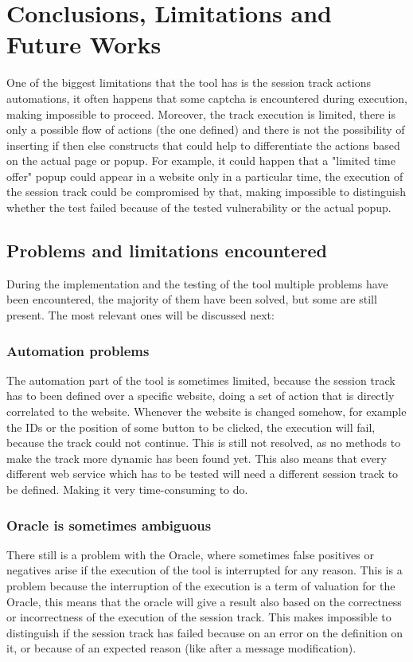 \chapter{Conclusions, Limitations and Future Works}
One of the biggest limitations that the tool has is the session track actions automations, it often happens that some captcha is encountered during execution, making impossible to proceed. Moreover, the track execution is limited, there is only a possible flow of actions (the one defined) and there is not the possibility of inserting if then else constructs that could help to differentiate the actions based on the actual page or popup. For example, it could happen that a "limited time offer" popup could appear in a website only in a particular time, the execution of the session track could be compromised by that, making impossible to distinguish whether the test failed because of the tested vulnerability or the actual popup.

\section{Problems and limitations encountered}
During the implementation and the testing of the tool multiple problems have been encountered, the majority of them have been solved, but some are still present. The most relevant ones will be discussed next:

\subsection{Automation problems}
The automation part of the tool is sometimes limited, because the session track has to been defined over a specific website, doing a set of action that is directly correlated to the website. Whenever the website is changed somehow, for example the IDs or the position of some button to be clicked, the execution will fail, because the track could not continue.
This is still not resolved, as no methods to make the track more dynamic has been found yet. This also means that every different web service which has to be tested will need a different session track to be defined. Making it very time-consuming to do.

\subsection{Oracle is sometimes ambiguous}
There still is a problem with the Oracle, where sometimes false positives or negatives arise if the execution of the tool is interrupted for any reason. This is a problem because the interruption of the execution is a term of valuation for the Oracle, this means that the oracle will give a result also based on the correctness or incorrectness of the execution of the \gls{session track}. This makes impossible to distinguish if the \gls{session track} has failed because on an error on the definition on it, or because of an expected reason (like after a message modification).

